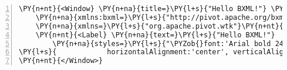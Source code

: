 \begin{Verbatim}[commandchars=\\\{\},numbers=left,firstnumber=1,stepnumber=1]
\PY{n+nt}{<Window} \PY{n+na}{title=}\PY{l+s}{"Hello BXML!"} \PY{n+na}{maximized=}\PY{l+s}{"true"}
    \PY{n+na}{xmlns:bxml=}\PY{l+s}{"http://pivot.apache.org/bxml"}
    \PY{n+na}{xmlns=}\PY{l+s}{"org.apache.pivot.wtk"}\PY{n+nt}{>}
    \PY{n+nt}{<Label} \PY{n+na}{text=}\PY{l+s}{"Hello BXML!"}
        \PY{n+na}{styles=}\PY{l+s}{"\PYZob{}font:'Arial bold 24', color:'#ff0000',}
\PY{l+s}{            horizontalAlignment:'center', verticalAlignment:'center'\PYZcb{}"}\PY{n+nt}{/>}
\PY{n+nt}{</Window>}
\end{Verbatim}
